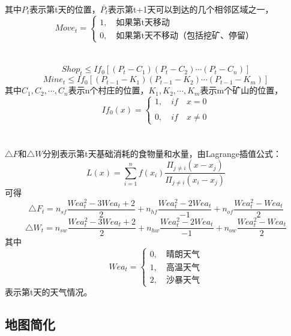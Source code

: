 \documentclass[withoutpre]{cumcmthesis} %
\begin{document}
其中$P_t$表示第t天的位置，$\bar{P_t}$表示第t+1天可以到达的几个相邻区域之一，
$$Move_t=\begin{cases}
1,\quad \text{如果第t天移动}\\
0,\quad \text{如果第t天不移动（包括挖矿、停留）}
\end{cases}$$\\\\
\begin{equation}
Shop_t\leqslant If_0[(P_t-C_1)(P_t-C_2)\cdots(P_t-C_n)]
\end{equation}
\begin{equation}
Mine_t\leqslant If_0[(P_{t-1}-K_1)(P_{t-1}-K_2)\cdots(P_{t-1}-K_m)]
\end{equation}其中$C_1,C_2,\cdots,C_n$表示n个村庄的位置，$K_1,K_2,\cdots,K_m$表示m个矿山的位置，
$$If_0(x)=\begin{cases}
1,\quad if\quad x=0\\\\
0,\quad if\quad x\neq0
\end{cases}$$\\\\

$\triangle F$和$\triangle W$分别表示第t天基础消耗的食物量和水量，由Lagrange插值公式：
$$L(x)=\sum_{i=1}^nf(x_i)\displaystyle\frac{\Pi_{j\neq i}(x-x_j)}{\Pi_{j\neq i}(x_i-x_j)}$$
可得
\begin{equation}
\triangle F_t=n_{sf}\frac{Wea_t^2-3Wea_t+2}{2}+n_{hf}\frac{Wea_t^2-2Wea_t}{-1}+n_{of}\frac{Wea_t^2-Wea_t}{2}
\end{equation}
\begin{equation}
\triangle W_t=n_{sw}\frac{Wea_t^2-3Wea_t+2}{2}+n_{hw}\frac{Wea_t^2-2Wea_t}{-1}+n_{ow}\frac{Wea_t^2-Wea_t}{2}
\end{equation}
其中$$Wea_t=\begin{cases}
0,\quad\text{晴朗天气}\\
1,\quad\text{高温天气}\\
2,\quad\text{沙暴天气}
\end{cases}$$表示第t天的天气情况。


\subsection{地图简化}
\end{document}
